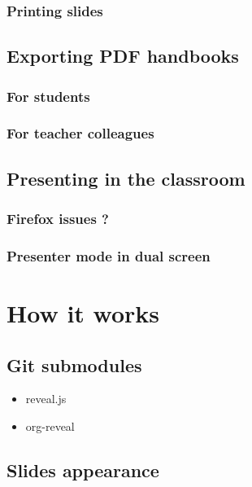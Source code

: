 \documentclass[a4paper]{article}
\begin{document}
\subsubsection{Printing slides}
\label{sec:org1f2064c}

\subsection{Exporting PDF handbooks}
\label{sec:orgb6b9603}

\subsubsection{For students}
\label{sec:orgacc868f}

\subsubsection{For teacher colleagues}
\label{sec:orgc1e156d}

\subsection{Presenting in the classroom}
\label{sec:orga20a65c}

\subsubsection{Firefox issues ?}
\label{sec:orgc06c3a0}

\subsubsection{Presenter mode in dual screen}
\label{sec:org87de329}

\section{How it works}
\label{sec:org290c544}
\subsection{Git submodules}
\label{sec:org3738443}

\begin{itemize}
\item reveal.js
\item org-reveal
\end{itemize}

\subsection{Slides appearance}
\label{sec:org8dbfb12}
\end{document}
